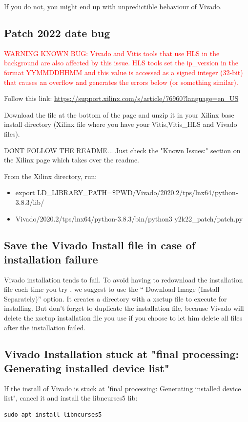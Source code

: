 \documentclass[11pt]{article}
\numberwithin{equation}{section}
\numberwithin{figure}{section}
\newcommand{\red}{\textcolor{red}}
\newcommand{\knownbug}[1]{\red{WARNING KNOWN BUG: #1}}
\begin{document}
If you do not, you might end up with unpredictible behaviour of Vivado.

\subsection{Patch 2022 date bug}
\label{2k22patch}
\knownbug{Vivado and Vitis tools that use HLS in the background are also affected by this issue. HLS tools set the ip\_version in the format YYMMDDHHMM and this value is accessed as a signed integer (32-bit) that causes an overflow and generates the errors below (or something similar).}

Follow this link: \url{https://support.xilinx.com/s/article/76960?language=en_US}

Download the file at the bottom of the page and unzip it in your Xilinx base install directory (Xilinx file where you have your Vitis,Vitis\_HLS and Vivado files). 

DONT FOLLOW THE README... Just check the "Known Issues:" section on the Xilinx page which takes over the readme.

From the Xilinx directory, run:
\begin{itemize}
\item export LD\_LIBRARY\_PATH=\$PWD/Vivado/2020.2/tps/lnx64/python-3.8.3/lib/
\item Vivado/2020.2/tps/lnx64/python-3.8.3/bin/python3 y2k22\_patch/patch.py
\end{itemize}

\subsection{Save the Vivado Install file in case of installation failure}
\label{installSave}

Vivado installation tends to fail. To avoid having to redownload the installation file each time you try , we suggest to use the “ Download Image (Install Separately)” option. It creates a directory with a xsetup file to execute for installing. But don't forget to duplicate the installation file, because Vivado will delete the xsetup installation file you use if you choose to let him delete all files after the installation failed.
\subsection{Vivado Installation stuck at "final processing: Generating installed device list"}
If the install of Vivado is stuck at "final processing: Generating installed device list", cancel it and install the libncurses5 lib:
\begin{verbatim}
sudo apt install libncurses5
\end{verbatim}
\end{document}
